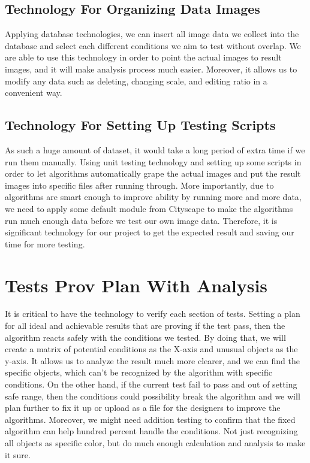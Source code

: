 \documentclass[10pt,draftclsnofoot,onecolumn,journal,compsoc]{IEEEtran}
\begin{document}
\subsection{Technology For Organizing Data Images}
Applying database technologies, we can insert all image data we collect into the database and select each different conditions we aim to test without overlap.
We are able to use this technology in order to point the actual images to result images, and it will make analysis process much easier.
Moreover, it allows us to modify any data such as deleting, changing scale, and editing ratio in a convenient way.

\subsection{Technology For Setting Up Testing Scripts}
As such a huge amount of dataset, it would take a long period of extra time if we run them manually. 
Using unit testing technology and setting up some scripts in order to let algorithms automatically grape the actual images and put the result images into specific files after running through. 
More importantly, due to algorithms are smart enough to improve ability by running more and more data, we need to apply some default module from Cityscape to make the algorithms run much enough data before we test our own image data.
Therefore, it is significant technology for our project to get the expected result and saving our time for more testing.


\section{Tests Prov Plan With Analysis}
It is critical to have the technology to verify each section of tests. 
Setting a plan for all ideal and achievable results that are proving if the test pass, then the algorithm reacts safely with the conditions we tested. 
By doing that, we will create a matrix of potential conditions as the X-axis and unusual objects as the y-axis.
It allows us to analyze the result much more clearer, and we can find the specific objects, which can't be recognized by the algorithm with specific conditions.
On the other hand, if the current test fail to pass and out of setting safe range, then the conditions could possibility break the algorithm and we will plan further to fix it up or upload as a file for the designers to improve the algorithms.
Moreover, we might need addition testing to confirm that the fixed algorithm can help hundred percent handle the conditions. Not just recognizing all objects as specific color, but do much enough calculation and analysis to make it sure.    
\end{document}
